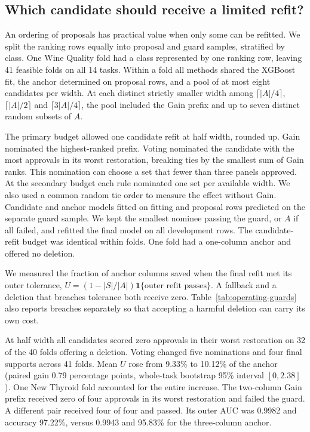 \subsection{Which candidate should receive a limited refit?}
\label{sec:budgeted}
An ordering of proposals has practical value when only some can be refitted. We split the ranking rows equally into proposal and guard samples, stratified by class. One Wine Quality fold had a class represented by one ranking row, leaving 41 feasible folds on all 14 tasks. Within a fold all methods shared the XGBoost fit, the anchor determined on proposal rows, and a pool of at most eight candidates per width. At each distinct strictly smaller width among $\lceil |A|/4\rceil$, $\lceil |A|/2\rceil$ and $\lceil3|A|/4\rceil$, the pool included the Gain prefix and up to seven distinct random subsets of $A$.

The primary budget allowed one candidate refit at half width, rounded up. Gain nominated the highest-ranked prefix. Voting nominated the candidate with the most approvals in its worst restoration, breaking ties by the smallest sum of Gain ranks. This nomination can choose a set that fewer than three panels approved. At the secondary budget each rule nominated one set per available width. We also used a common random tie order to measure the effect without Gain. Candidate and anchor models fitted on fitting and proposal rows predicted on the separate guard sample. We kept the smallest nominee passing the guard, or $A$ if all failed, and refitted the final model on all development rows. The candidate-refit budget was identical within folds. One fold had a one-column anchor and offered no deletion.

We measured the fraction of anchor columns saved when the final refit met its outer tolerance, $U=(1-|S|/|A|)\mathbf 1\{\text{outer refit passes}\}$. A fallback and a deletion that breaches tolerance both receive zero. Table~\ref{tab:operating-guards} also reports breaches separately so that accepting a harmful deletion can carry its own cost.



At half width all candidates scored zero approvals in their worst restoration on 32 of the 40 folds offering a deletion. Voting changed five nominations and four final supports across 41 folds. Mean $U$ rose from 9.33\% to 10.12\% of the anchor (paired gain 0.79 percentage points, whole-task bootstrap 95\% interval $[0,2.38]$). One New Thyroid fold accounted for the entire increase. The two-column Gain prefix received zero of four approvals in its worst restoration and failed the guard. A different pair received four of four and passed. Its outer AUC was 0.9982 and accuracy 97.22\%, versus 0.9943 and 95.83\% for the three-column anchor.

